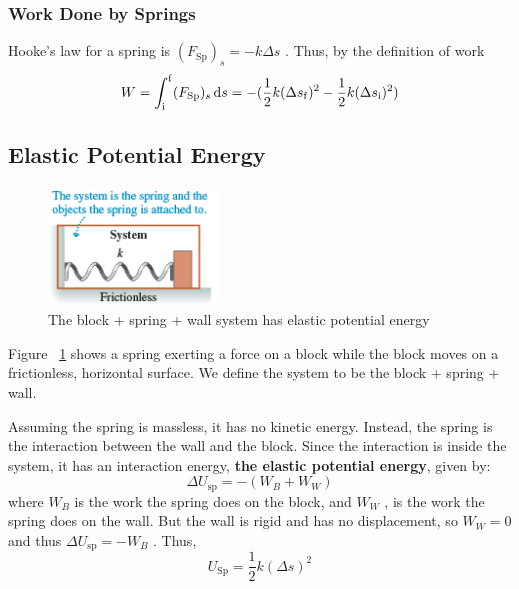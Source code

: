 \subsubsection{Work Done by Springs}

Hooke's law for a spring is
$
    (F_\mathrm{Sp})_s = -k\Delta s
$%
.  Thus, by the definition of work
\begin{equation}
    W = \int_\ini^\fin (F_\mathrm{Sp})_s \dif s = -(\frac{1}{2}k(\Delta
    s_\fin)^2 - \frac{1}{2}k(\Delta s_\ini)^2)
\end{equation}

\subsection{Elastic Potential Energy}

\begin{figure}
    \centering
    \includegraphics[width=0.4\textwidth]{../figures/block-spring-wall-sys.png}
    \caption{The block + spring + wall system has elastic potential
    energy}%
    \label{fig:block-spring-wall-sys}
\end{figure}

Figure~%
\ref{fig:block-spring-wall-sys} shows a spring exerting a force on a
block while the block moves on a frictionless, horizontal surface.  We
define the system to be the block + spring + wall.

Assuming the spring is massless, it has no kinetic energy.  Instead, the
spring is the interaction between the wall and the block.  Since the
interaction is inside the system, it has an interaction energy, \textbf{the
elastic potential energy}, given by:
\begin{equation}
    \Delta U_\mathrm{sp} = -(W_B + W_W)
\end{equation}
where
$
    W_B
$ is the work the spring does on the block, and
$
    W_W
$%
, is the work the spring does on the wall.  But the wall is rigid and
has no displacement, so
$
    W_W = 0
$ and thus
$
    \Delta U_\mathrm{sp} = -W_B
$%
.  Thus,
\begin{equation}
    U_\mathrm{Sp} = \frac{1}{2}k(\Delta s)^2
\end{equation}

